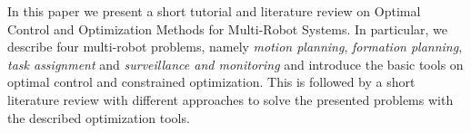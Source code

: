 In this paper we present a short tutorial and literature review on Optimal Control and Optimization Methods for Multi-Robot Systems. In particular, we describe four multi-robot problems, namely \emph{motion planning}, \emph{formation planning}, \emph{task assignment} and \emph{surveillance and monitoring} and introduce the basic tools on optimal control and constrained optimization. This is followed by a short literature review with different approaches to solve the presented problems with the described optimization tools.